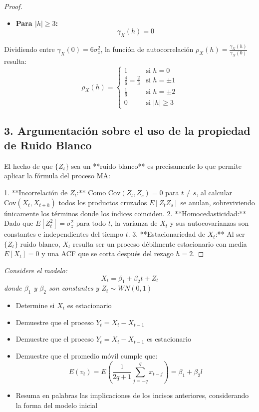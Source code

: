 \documentclass[11pt,letterpaper]{article}
\begin{document}
\begin{proof}
\begin{itemize}
    \item \textbf{Para $|h| \ge 3$:}
    \[
    \gamma_X(h) = 0
    \]
\end{itemize}

Dividiendo entre $\gamma_X(0) = 6 \sigma_z^2$, la función de autocorrelación $\rho_X(h) = \frac{\gamma_X(h)}{\gamma_X(0)}$ resulta:
\[
\rho_X(h) = 
\begin{cases} 
1 & \text{si } h = 0 \\
\frac{4}{6} = \frac{2}{3} & \text{si } h = \pm 1 \\
\frac{1}{6} & \text{si } h = \pm 2 \\
0 & \text{si } |h| \ge 3
\end{cases}
\]

\subsection*{3. Argumentación sobre el uso de la propiedad de Ruido Blanco}

El hecho de que $\{Z_t\}$ sea un **ruido blanco** es precisamente lo que permite aplicar la fórmula del proceso $\text{MA}$:

1. **Incorrelación de $Z_t$:** Como $\text{Cov}(Z_t, Z_s) = 0$ para $t \neq s$, al calcular $\text{Cov}(X_t, X_{t+h})$ todos los productos cruzados $E[Z_t Z_s]$ se anulan, sobreviviendo únicamente los términos donde los índices coinciden.
2. **Homocedasticidad:** Dado que $E[Z_t^2] = \sigma_z^2$ para todo $t$, la varianza de $X_t$ y sus autocovarianzas son constantes e independientes del tiempo $t$.
3. **Estacionariedad de $X_t$:** Al ser $\{Z_t\}$ ruido blanco, $X_t$ resulta ser un proceso débilmente estacionario con media $E[X_t] = 0$ y una ACF que se corta después del rezago $h = 2$. 

\end{proof}
\begin{tcolorbox}[
	title = \textcolor{black}{\textcolor{white}{Problema 11}},]
\textit{Considere el modelo:\,\\
\begin{equation*}
    X_t=\beta_1+\beta_2t+Z_t
\end{equation*}
donde $\beta_1$ y $\beta_2$ son constantes y $Z_t\sim WN(0,1)$}
\begin{itemize}
    \item Determine si $X_t$ es estacionario
    \item Demuestre que el proceso $Y_t=X_t-X_{t-1}$
    \item Demuestre que el proceso $Y_t=X_t-X_{t-1}$ es estacionario
    \item Demuestre que el promedio m\'ovil cumple que:\,\\
    \begin{equation*}
        E(v_t)=E\left(\frac{1}{2q+1}\sum_{j=-q}^q x_{t-j}\right)=\beta_1+\beta_2l
    \end{equation*}
    \item Resuma en palabras las implicaciones de los incisos anteriores, considerando la forma del modelo inicial 
\end{itemize}
\end{tcolorbox}
\end{document}
